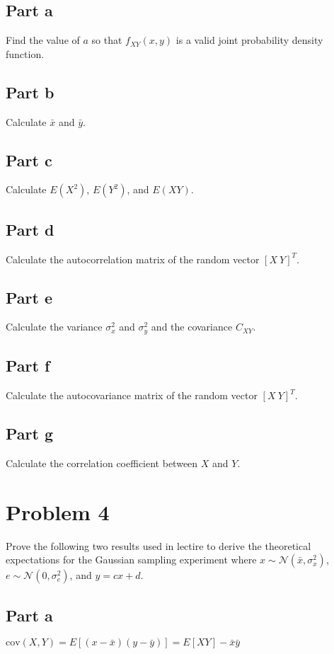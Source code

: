 \documentclass[11pt]{article}
\begin{document}
\subsection*{Part a}
Find the value of $a$ so that $f_{XY}(x,y)$ is a valid joint probability density function.

\subsection*{Part b}
Calculate $\bar{x}$ and $\bar{y}$.

\subsection*{Part c}
Calculate $E(X^2)$, $E(Y^2)$, and $E(XY)$.

\subsection*{Part d}
Calculate the autocorrelation matrix of the random vector $[X\ Y]^T$.

\subsection*{Part e}
Calculate the variance $\sigma_x^2$ and $\sigma_y^2$ and the covariance $C_{XY}$.

\subsection*{Part f}
Calculate the autocovariance matrix of the random vector $[X\ Y]^T$.

\subsection*{Part g}
Calculate the correlation coefficient between $X$ and $Y$.

\section*{Problem 4}
Prove the following two results used in lectire to derive the theoretical expectations for the Gaussian sampling experiment where $x\sim \mathcal{N}(\bar{x},\sigma_x^2)$, $e\sim \mathcal{N}(0,\sigma_e^2)$, and $y=cx+d$.

\subsection*{Part a}
$\text{cov}(X,Y) = E[(x-\bar{x})(y-\bar{y})]=E[XY]-\bar{x}\bar{y}$
\end{document}
